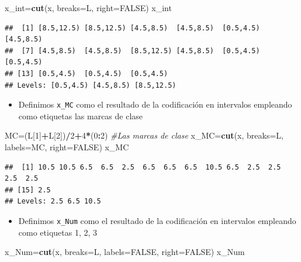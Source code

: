 \documentclass[]{book}
\newenvironment{Shaded}{\begin{snugshade}}{\end{snugshade}}
\newcommand{\CommentTok}[1]{\textcolor[rgb]{0.56,0.35,0.01}{\textit{#1}}}
\newcommand{\DataTypeTok}[1]{\textcolor[rgb]{0.13,0.29,0.53}{#1}}
\newcommand{\DecValTok}[1]{\textcolor[rgb]{0.00,0.00,0.81}{#1}}
\newcommand{\KeywordTok}[1]{\textcolor[rgb]{0.13,0.29,0.53}{\textbf{#1}}}
\newcommand{\NormalTok}[1]{#1}
\newcommand{\OperatorTok}[1]{\textcolor[rgb]{0.81,0.36,0.00}{\textbf{#1}}}
\newcommand{\OtherTok}[1]{\textcolor[rgb]{0.56,0.35,0.01}{#1}}
\providecommand{\tightlist}{%
  \setlength{\itemsep}{0pt}\setlength{\parskip}{0pt}}
\theoremstyle{definition}
\theoremstyle{definition}
\theoremstyle{definition}
\theoremstyle{remark}
\begin{document}
\begin{Shaded}
\begin{Highlighting}[]
\NormalTok{x_int=}\KeywordTok{cut}\NormalTok{(x, }\DataTypeTok{breaks=}\NormalTok{L, }\DataTypeTok{right=}\OtherTok{FALSE}\NormalTok{)}
\NormalTok{x_int}
\end{Highlighting}
\end{Shaded}

\begin{verbatim}
##  [1] [8.5,12.5) [8.5,12.5) [4.5,8.5)  [4.5,8.5)  [0.5,4.5)  [4.5,8.5) 
##  [7] [4.5,8.5)  [4.5,8.5)  [8.5,12.5) [4.5,8.5)  [0.5,4.5)  [0.5,4.5) 
## [13] [0.5,4.5)  [0.5,4.5)  [0.5,4.5) 
## Levels: [0.5,4.5) [4.5,8.5) [8.5,12.5)
\end{verbatim}

\begin{itemize}
\tightlist
\item
  Definimos \texttt{x\_MC} como el resultado de la codificación en intervalos empleando como etiquetas las marcas de clase
\end{itemize}

\begin{Shaded}
\begin{Highlighting}[]
\NormalTok{MC=(L[}\DecValTok{1}\NormalTok{]}\OperatorTok{+}\NormalTok{L[}\DecValTok{2}\NormalTok{])}\OperatorTok{/}\DecValTok{2}\OperatorTok{+}\DecValTok{4}\OperatorTok{*}\NormalTok{(}\DecValTok{0}\OperatorTok{:}\DecValTok{2}\NormalTok{)  }\CommentTok{#Las marcas de clase}
\NormalTok{x_MC=}\KeywordTok{cut}\NormalTok{(x, }\DataTypeTok{breaks=}\NormalTok{L, }\DataTypeTok{labels=}\NormalTok{MC, }\DataTypeTok{right=}\OtherTok{FALSE}\NormalTok{)}
\NormalTok{x_MC}
\end{Highlighting}
\end{Shaded}

\begin{verbatim}
##  [1] 10.5 10.5 6.5  6.5  2.5  6.5  6.5  6.5  10.5 6.5  2.5  2.5  2.5  2.5 
## [15] 2.5 
## Levels: 2.5 6.5 10.5
\end{verbatim}

\begin{itemize}
\tightlist
\item
  Definimos \texttt{x\_Num} como el resultado de la codificación en intervalos empleando como etiquetas 1, 2, 3
\end{itemize}

\begin{Shaded}
\begin{Highlighting}[]
\NormalTok{x_Num=}\KeywordTok{cut}\NormalTok{(x, }\DataTypeTok{breaks=}\NormalTok{L, }\DataTypeTok{labels=}\OtherTok{FALSE}\NormalTok{, }\DataTypeTok{right=}\OtherTok{FALSE}\NormalTok{)}
\NormalTok{x_Num}
\end{Highlighting}
\end{Shaded}
\end{document}
